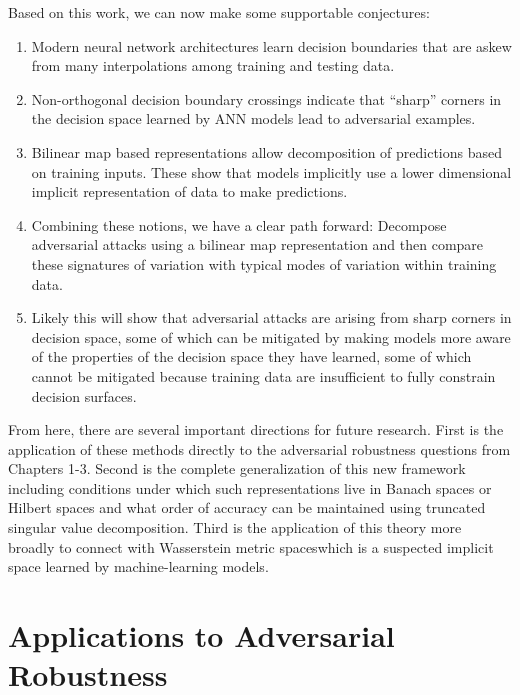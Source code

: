 Based on this work, we can now make some supportable conjectures:

\begin{enumerate}
  \item Modern neural network architectures learn decision boundaries
    that are askew from many interpolations among training and testing
    data.
  \item Non-orthogonal decision boundary crossings indicate that
    ``sharp'' corners in the decision space learned by ANN models lead
    to adversarial examples.
  \item Bilinear map based representations allow decomposition of
    predictions based on training inputs. These show that models
    implicitly use a lower dimensional implicit representation of data
    to make predictions.
  \item Combining these notions, we have a clear path forward:
    Decompose adversarial attacks using a bilinear map
    representation and then compare these signatures of variation with
    typical modes of variation within training data.
  \item Likely this will show that adversarial attacks are arising
    from sharp corners in decision space, some of which can be
    mitigated by making models more aware of the properties of the
    decision space they have learned, some of which cannot be
    mitigated because training data are insufficient to fully
    constrain decision surfaces. 
\end{enumerate}

From here, there are several important directions for
future research. First is the application of these methods directly to
the adversarial robustness questions from Chapters 1-3. Second is the
complete generalization of this new framework including conditions
under which such representations live in Banach spaces or Hilbert
spaces and what order of accuracy can be maintained using truncated
singular value decomposition. Third is the application of this theory more
broadly to connect with Wasserstein metric spaceswhich is a suspected implicit space learned by machine-learning models. 

\section{Applications to Adversarial Robustness}

